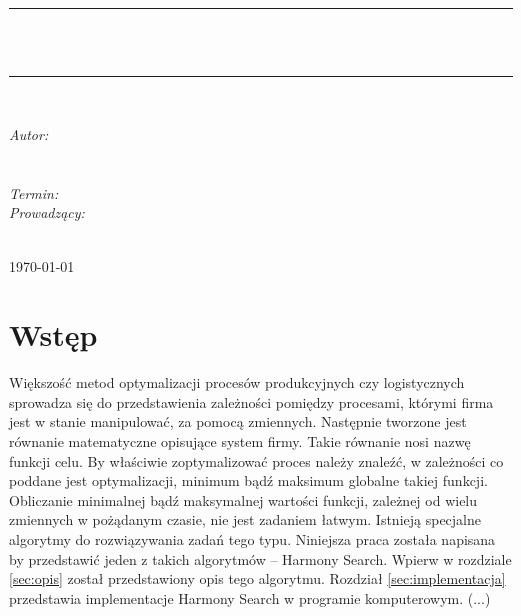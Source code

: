 \documentclass[10pt, a4paper]{article}
\begin{document}
\def\tablename{Tabela}	%
\begin{titlepage}
	\begin{center}
		\textsc{\LARGE \formakursu}\\[1cm]		
		\textsc{\Large \kurs}\\[0.5cm]		
		\rule{\textwidth}{0.08cm}\\[1cm]
		{\huge \bfseries \doctype}\\[1cm]
		\rule{\textwidth}{0.08cm}\\[1cm]
		\begin{flushright} \large
		\emph{Autor: }\\
		\osobaA\\
		\osobaB\\[0.4cm]
		\emph{Termin: }\termin\\[0.4cm]
		\emph{Prowadzący:} \\
		\prowadzacy \\
		\end{flushright}
		\vfill
		{\large \today}
	\end{center}	
\end{titlepage}
\newpage
\tableofcontents
\newpage

\begin{figure}[htbp]
	\centering
\end{figure}

\section{Wstęp}
\label{sec:wstep}
Większość metod optymalizacji procesów produkcyjnych czy logistycznych sprowadza się do przedstawienia zależności pomiędzy procesami, którymi firma jest w stanie manipulować, za pomocą zmiennych. Następnie tworzone jest równanie matematyczne opisujące system firmy. Takie równanie nosi nazwę funkcji celu. By właściwie zoptymalizować proces należy znaleźć, w zależności co poddane jest optymalizacji, minimum bądź maksimum globalne takiej funkcji. Obliczanie minimalnej bądź maksymalnej wartości funkcji, zależnej od wielu zmiennych w pożądanym czasie, nie jest zadaniem łatwym. Istnieją specjalne algorytmy do rozwiązywania zadań tego typu. Niniejsza praca została napisana by przedstawić jeden z takich algorytmów -- Harmony Search. Wpierw w rozdziale \ref{sec:opis} został przedstawiony opis tego algorytmu. Rozdział \ref{sec:implementacja} przedstawia implementacje Harmony Search w programie komputerowym. (...)
\end{document}
